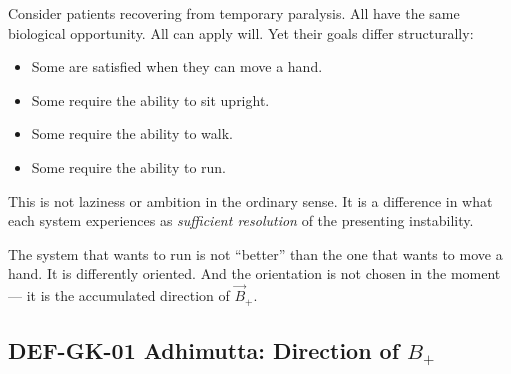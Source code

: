 \documentclass[12pt, a4paper]{article}
\providecommand{\Bvec}{\vec{B}_{+}}
\begin{document}

\begin{keybox}[title={The Observation That Motivated Gift~K}]
Consider patients recovering from temporary paralysis. All have
the same biological opportunity. All can apply will.
Yet their goals differ structurally:

\begin{itemize}[leftmargin=*, noitemsep]
\item Some are satisfied when they can move a hand.
\item Some require the ability to sit upright.
\item Some require the ability to walk.
\item Some require the ability to run.
\end{itemize}

This is not laziness or ambition in the ordinary sense.
It is a difference in what each system experiences as
\emph{sufficient resolution} of the presenting instability.

The system that wants to run is not ``better'' than the one
that wants to move a hand. It is differently oriented.
And the orientation is not chosen in the moment ---
it is the accumulated direction of $\Bvec$.
\end{keybox}

\subsection{DEF-GK-01 \quad Adhimutta: Direction of \texorpdfstring{$B_+$}{B+}}

\end{document}
